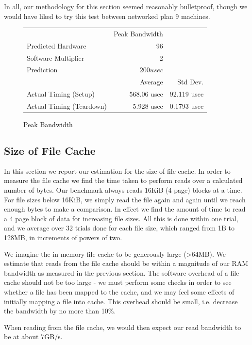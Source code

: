 \documentclass[letterpaper,twocolumn,10pt]{article}
\begin{document}
In all, our methodology for this section seemed reasonably bulletproof, though we would have liked to try this test between networked plan 9 machines.

\begin{figure}
	\centering
    \begin{tabular}{l r r}
      & Peak Bandwidth \\
      Predicted Hardware & 96\\
      Software Multiplier & 2 \\
      Prediction & $200 usec$ \\
                   & Average & Std Dev.\\
        Actual Timing (Setup) & 568.06 usec & 92.119 usec \\
        Actual Timing (Teardown) & 5.928 usec  & 0.1793 usec \\
\end{tabular}
\caption{Peak Bandwidth}
\label{tab:peakbandwidth}
\end{figure}

\subsection{Size of File Cache}
In this section we report our estimation for the size of file cache. In order to
measure the file cache we find the time taken to perform reads over a calculated
number of bytes. Our benchmark always reads 16KiB (4 page) blocks at a time. For
file sizes below 16KiB, we simply read the file again and again until we reach
enough bytes to make a comparison. In effect we find the amount of time to read
a 4 page block of data for increasing file sizes. All this is done within one
trial, and we average over 32 trials done for each file size, which ranged
from 1B to 128MB, in increments of powers of two.

We imagine the in-memory file cache to be generously large (>64MB). We estimate
that reads from the file cache should be within a magnitude of our RAM bandwidth
as measured in the previous section. The software overhead of a file cache should
not be too large - we must perform some checks in order to see whether a file
has been mapped to the cache, and we may feel some effects of initially mapping
a file into cache. This overhead should be small, i.e. decrease the bandwidth
by no more than 10\%.

When reading from the file cache, we would then expect our read bandwidth to be
at about 7GB/s.
\end{document}
